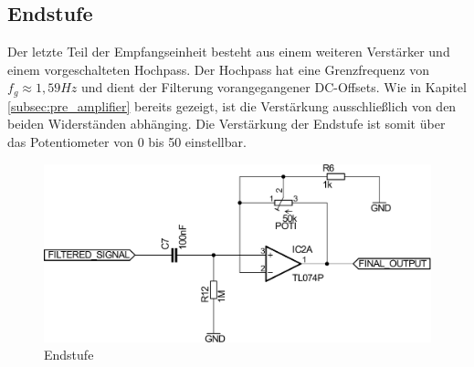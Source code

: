 \subsection{Endstufe}
\label{sec:endamp}
Der letzte Teil der Empfangseinheit besteht aus einem weiteren Verstärker und einem vorgeschalteten Hochpass. Der Hochpass hat eine Grenzfrequenz von $f_{g} \approx 1,59Hz$ und dient der Filterung vorangegangener DC-Offsets. Wie in Kapitel \ref{subsec:pre_amplifier} bereits gezeigt, ist die Verstärkung ausschließlich von den beiden Widerständen abhänging. Die Verstärkung der Endstufe ist somit über das Potentiometer von 0 bis 50 einstellbar.
\begin{figure}[H]
	\centering
	\includegraphics[scale=0.5]{gfx/post_amplifier.pdf}
	\caption{Endstufe}
	\label{fig:endamp}
\end{figure}